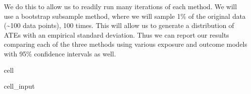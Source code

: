 \documentclass[letterpaper,10pt,english]{jupyterBook}
\begin{document}
\sphinxAtStartPar
We do this to allow us to readily run many iterations of each method. We will use a bootstrap subsample method, where we will sample 1\% of the original data (\textasciitilde{}100 data points), 100 times. This will allow us to generate a distribution of ATEs with an empirical standard deviation. Thus we can report our results comparing each of the three methods using various exposure and outcome models with 95\% confidence intervals as well.

\begin{sphinxuseclass}{cell}\begin{sphinxVerbatimInput}

\begin{sphinxuseclass}{cell_input}
\begin{sphinxVerbatim}[commandchars=\\\{\}]

   
     \PYG{p}{[}\PYG{p}{]}\PYG{p}{[}\PYG{p}{[}\PYG{p}{]}  \PYG{p}{]}  \PYG{p}{[}\PYG{p}{]}\PYG{p}{[}\PYG{p}{[}\PYG{p}{]}  \PYG{p}{]}

      

     
           \PYG{p}{[}\PYG{p}{]} \PYG{p}{[}\PYG{p}{]}\PYG{p}{[}\PYG{p}{]}\PYG{p}{[} \PYG{p}{]}
            \PYG{p}{[}\PYG{p}{]}


\end{sphinxVerbatim}
\end{sphinxuseclass}
\end{sphinxVerbatimInput}
\end{sphinxuseclass}
\end{document}
